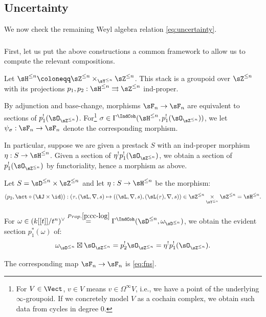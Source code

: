 \subsection{Uncertainty}

We now check the remaining Weyl algebra relation
\eqref{eq:uncertainty}.

\subsubsection{}\label{ss:gpd}

First, let us put the above constructions a common framework to allow us to
compute the relevant compositions.

Let $\sH^{\leq n} \coloneqq \sZ^{\leq n} \times_{\sY^{\leq n}} \sZ^{\leq n}$.
This stack is a groupoid over $\sZ^{\leq n}$ with its projections
$p_1,p_2:\sH^{\leq n} \rightrightarrows \sZ^{\leq n}$ ind-proper.

By adjunction and base-change, morphisms $\sF_n \to \sF_n$ are equivalent to
sections of $p_1^!(\sO_{\sZ^{\leq n}})$. For\footnote{For $V \in \Vect$,
$v\in V$ means $v \in \Omega^{\infty} V$, i.e., we have a point of the
underlying $\infty$-groupoid. If we concretely model $V$ as a cochain
complex, we obtain such data from cycles in degree $0$.}
$\sigma \in \Gamma^{\IndCoh}(\sH^{\leq n},p_1^!(\sO_{\sZ^{\leq n}}))$,
we let $\psi_{\sigma}:\sF_n \to \sF_n$ denote the corresponding morphism.

In particular, suppose we are given a prestack $S$ with an ind-proper morphism
$\eta:S \to \sH^{\leq n}$. Given a section of
$\eta^!p_1^!(\sO_{\sZ^{\leq n}})$, we obtain a section of
$p_1^!(\sO_{\sZ^{\leq n}})$ by functoriality, hence a morphism
as above.

\begin{example}
\notready\label{e:fns}

Let $S = \sD^{\leq n} \times \sZ^{\leq n}$ and let
$\eta:S \to \sH^{\leq n}$
be the morphism:
%
\[
(p_2,\act\circ (\AJ \times \id)):
(\tau,(\sL,\nabla,s) \mapsto ((\sL,\nabla,s),(\sL(\tau),\nabla,s)) \in
\sZ^{\leq n} \underset{\sY^{\leq n}}{\times} \sZ^{\leq n} =
\sH^{\leq n}.
\]

For $\omega \in (k[[t]]/t^n)^{\vee} \overset{Prop. \ref{p:cc-log}}{=}
\Gamma^{\IndCoh}(\sD^{\leq n},\omega_{\sD^{\leq n}})$, we
obtain the evident section $p_1^*(\omega)$ of:
%
\[
\omega_{\sD^{\leq n}} \boxtimes \sO_{\sZ^{\leq n}} =
p_2^! \sO_{\sZ^{\leq n}}  =
\eta^!p_1^!(\sO_{\sZ^{\leq n}}).
\]

 The corresponding map $\sF_n \to \sF_n$ is
\eqref{eq:fns}.

\end{example}

